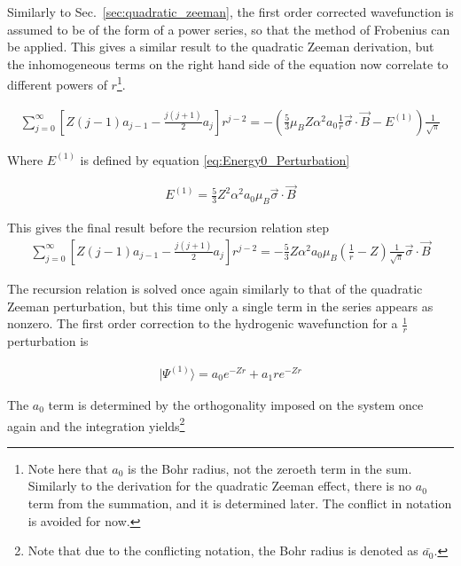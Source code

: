             \noindent Similarly to Sec.~\ref{sec:quadratic_zeeman}, the first order corrected wavefunction is assumed to be of the form of a power series, so that the method of Frobenius can be applied. This gives a similar result to the quadratic Zeeman derivation, but the inhomogeneous terms on the right hand side of the equation now correlate to different powers of $r$\footnote{Note here that $a_0$ is the Bohr radius, not the zeroeth term in the sum. Similarly to the derivation for the quadratic Zeeman effect, there is no $a_0$ term from the summation, and it is determined later. The conflict in notation is avoided for now.}.

            \begin{align}
                \sum_{j = 0}^\infty \left[ Z(j-1)a_{j-1} - \frac{j(j+1)}{2} a_j \right] r^{j -2} = -\left(\frac{5}{3}\mu_B Z \alpha^2 a_0 \frac{1}{r} \vec{\sigma} \cdot \vec{B} - E^{(1)} \right) \frac{1}{\sqrt{\pi}}
            \end{align}

            \noindent Where $E^{(1)}$ is defined by equation \eqref{eq:Energy0_Perturbation}

            \begin{align}
                E^{(1)} = \frac{5}{3} Z^2 \alpha^2 a_0 \mu_B \vec{\sigma} \cdot \vec{B}
            \end{align}

            \noindent This gives the final result before the recursion relation step
            \begin{align}
                \sum_{j = 0}^\infty \left[ Z(j-1)a_{j-1} - \frac{j(j+1)}{2} a_j \right] r^{j -2} = -\frac{5}{3} Z \alpha^2 a_0 \mu_B \left(\frac{1}{r} - Z \right) \frac{1}{\sqrt{\pi}}\vec{\sigma} \cdot \vec{B}
            \end{align}

            \noindent The recursion relation is solved once again similarly to that of the quadratic Zeeman perturbation, but this time only a single term in the series appears as nonzero. The first order correction to the hydrogenic wavefunction for a $\frac{1}{r}$ perturbation is 

            \begin{align}
                \vert \varPsi^{(1)} \rangle = a_0 e^{-Zr} + a_1 re^{-Zr}
            \end{align}

            \noindent The $a_0$ term is determined by the orthogonality imposed on the system once again and the integration yields\footnote{Note that due to the conflicting notation, the Bohr radius is denoted as $\bar{a_0}$.}
            
